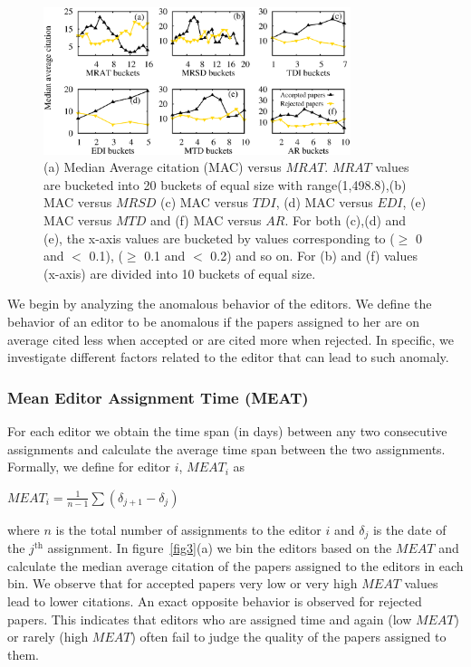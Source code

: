 \begin{figure}[!ht]
\centering
\includegraphics*[width=0.8\textwidth]{./texfiles/Chapter_4/cikm/figures/reviewer_all.eps}
\caption{\label{fig5}(a) Median Average citation (MAC) versus $MRAT$. $MRAT$ values are bucketed into 20 buckets of equal size with range(1,498.8),(b) MAC versus $MRSD$ (c) MAC versus $TDI$, (d) MAC versus $EDI$, (e) MAC versus $MTD$ and (f) MAC versus $AR$. For both (c),(d) and (e), the x-axis values are bucketed by values corresponding to ($\geq$ 0 and $<$ 0.1), ($\geq$ 0.1 and $<$ 0.2) and so on. For (b) and (f) values (x-axis) are divided into 10 buckets of equal size.}
\end{figure}

We begin by analyzing the anomalous behavior of the editors. We define the behavior of an editor to be anomalous if the papers assigned to her are on average cited less when accepted or are cited more when rejected. In specific, we investigate different factors related to the editor that can lead to such anomaly.
\subsubsection{Mean Editor Assignment Time (MEAT)}
For each editor we obtain the time span (in days) between any two consecutive assignments and calculate the average time span between the two assignments. 
Formally, we define for editor $i$, $MEAT_{i}$ as
\begin{center}
$MEAT_{i}=\frac{1}{n-1}\sum (\delta_{j+1} - \delta_{j})$
\end{center}
where $n$ is the total number of assignments to the editor $i$ and $\delta_{j}$ is the date of the $j$$^\textrm{th}$ assignment. 
In figure~\ref{fig3}(a) we bin the editors based on the $MEAT$ and calculate the median average citation of the papers assigned to the editors in each bin. 
{We observe that for accepted papers very low or very high $MEAT$ values lead to lower citations. An exact opposite behavior is observed for rejected papers. 
This indicates that editors who are assigned time and again (low $MEAT$) or rarely (high $MEAT$) often fail to judge the quality of the papers assigned to them.} 

